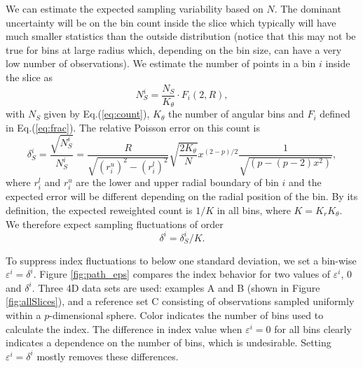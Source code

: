 \documentclass[]{interact}
\theoremstyle{plain}%
\theoremstyle{definition}
\theoremstyle{remark}
\begin{document}
We can estimate the expected sampling variability based on \(N\). The
dominant uncertainty will be on the bin count inside the slice which
typically will have much smaller statistics than the outside
distribution (notice that this may not be true for bins at large radius
which, depending on the bin size, can have a very low number of
observations). We estimate the number of points in a bin \(i\) inside
the slice as \begin{equation}
N_S^i = \frac{N_S}{K_{\theta}} \cdot F_i(2, R),
\end{equation} with \(N_S\) given by Eq.(\ref{eq:count}), \(K_{\theta}\)
the number of angular bins and \(F_i\) defined in Eq.(\ref{eq:frac}).
The relative Poisson error on this count is \begin{equation}
\delta_S^i = \frac{\sqrt{N_S^i}}{N_S^i} = 
\frac{R}{\sqrt{(r_i^u)^2 - (r_i^l)^2}} \sqrt{\frac{2 K_{\theta}}{N}} x^{(2-p)/2}
\frac{1}{\sqrt{\left(p - (p-2) x^{2}\right)}}, 
\end{equation} where \(r_i^l\) and \(r_i^u\) are the lower and upper
radial boundary of bin \(i\) and the expected error will be different
depending on the radial position of the bin. By its definition, the
expected reweighted count is \(1/K\) in all bins, where
\(K=K_r K_{\theta}\). We therefore expect sampling fluctuations of order
\begin{equation}
\delta^i = \delta_S^i / K. 
\label{eq:eps}
\end{equation}

To suppress index fluctuations to below one standard deviation, we set a
bin-wise \(\varepsilon^i = \delta^i\). Figure \ref{fig:path_eps}
compares the index behavior for two values of \(\varepsilon^i\), \(0\)
and \(\delta^i\). Three 4D data sets are used: examples A and B (shown
in Figure \ref{fig:allSlices}), and a reference set C consisting of
observations sampled uniformly within a \(p\)-dimensional sphere. Color
indicates the number of bins used to calculate the index. The difference
in index value when \(\varepsilon^i=0\) for all bins clearly indicates a
dependence on the number of bins, which is undesirable. Setting
\(\varepsilon^i = \delta^i\) mostly removes these differences.
\end{document}
